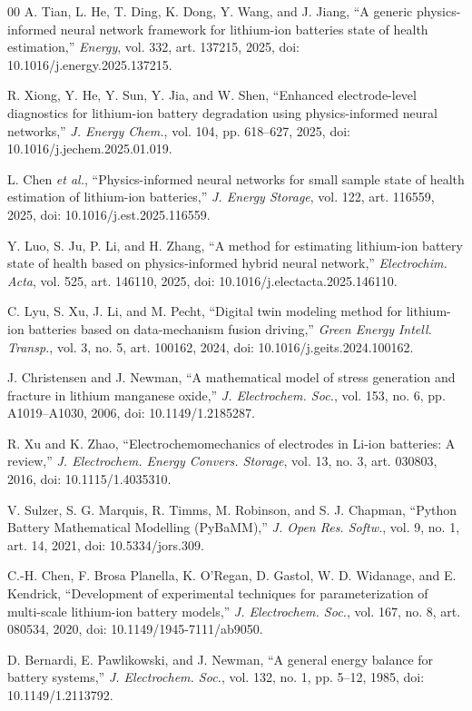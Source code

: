 \documentclass[conference]{IEEEtran}
\begin{document}
\begin{thebibliography}{00}
A. Tian, L. He, T. Ding, K. Dong, Y. Wang, and J. Jiang, ``A generic physics-informed neural network framework for lithium-ion batteries state of health estimation,'' \emph{Energy}, vol. 332, art. 137215, 2025, doi: 10.1016/j.energy.2025.137215.

R. Xiong, Y. He, Y. Sun, Y. Jia, and W. Shen, ``Enhanced electrode-level diagnostics for lithium-ion battery degradation using physics-informed neural networks,'' \emph{J. Energy Chem.}, vol. 104, pp. 618--627, 2025, doi: 10.1016/j.jechem.2025.01.019.

L. Chen \emph{et al.}, ``Physics-informed neural networks for small sample state of health estimation of lithium-ion batteries,'' \emph{J. Energy Storage}, vol. 122, art. 116559, 2025, doi: 10.1016/j.est.2025.116559.

Y. Luo, S. Ju, P. Li, and H. Zhang, ``A method for estimating lithium-ion battery state of health based on physics-informed hybrid neural network,'' \emph{Electrochim. Acta}, vol. 525, art. 146110, 2025, doi: 10.1016/j.electacta.2025.146110.

C. Lyu, S. Xu, J. Li, and M. Pecht, ``Digital twin modeling method for lithium-ion batteries based on data-mechanism fusion driving,'' \emph{Green Energy Intell. Transp.}, vol. 3, no. 5, art. 100162, 2024, doi: 10.1016/j.geits.2024.100162.

J. Christensen and J. Newman, ``A mathematical model of stress generation and fracture in lithium manganese oxide,'' \emph{J. Electrochem. Soc.}, vol. 153, no. 6, pp. A1019--A1030, 2006, doi: 10.1149/1.2185287.

R. Xu and K. Zhao, ``Electrochemomechanics of electrodes in Li-ion batteries: A review,'' \emph{J. Electrochem. Energy Convers. Storage}, vol. 13, no. 3, art. 030803, 2016, doi: 10.1115/1.4035310.

V. Sulzer, S. G. Marquis, R. Timms, M. Robinson, and S. J. Chapman, ``Python Battery Mathematical Modelling (PyBaMM),'' \emph{J. Open Res. Softw.}, vol. 9, no. 1, art. 14, 2021, doi: 10.5334/jors.309.

C.-H. Chen, F. Brosa Planella, K. O'Regan, D. Gastol, W. D. Widanage, and E. Kendrick, ``Development of experimental techniques for parameterization of multi-scale lithium-ion battery models,'' \emph{J. Electrochem. Soc.}, vol. 167, no. 8, art. 080534, 2020, doi: 10.1149/1945-7111/ab9050.

D. Bernardi, E. Pawlikowski, and J. Newman, ``A general energy balance for battery systems,'' \emph{J. Electrochem. Soc.}, vol. 132, no. 1, pp. 5--12, 1985, doi: 10.1149/1.2113792.

\end{thebibliography}
\end{document}
